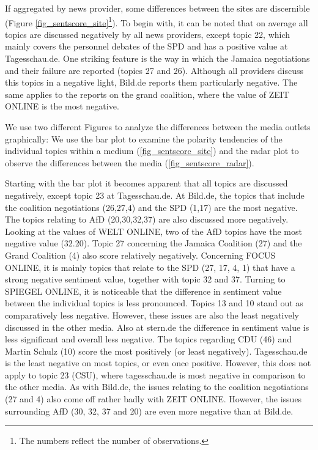 \documentclass[12pt,a4paper,notitlepage]{article}
\begin{document}
If aggregated by news provider, some differences between the sites are discernible (Figure \ref{fig_sentscore_site}\footnote{The numbers reflect the number of observations.}). To begin with, it can be noted that on average all topics are discussed negatively by all news providers, except topic 22, which mainly covers the personnel debates of the SPD and has a positive value at Tagesschau.de. One striking feature is the way in which the Jamaica negotiations and their failure are reported (topics 27 and 26). Although all providers discuss this topics in a negative light, Bild.de reports them particularly negative. The same applies to the reports on the grand coalition, where the value of ZEIT ONLINE is the most negative. 

We use two different Figures to analyze the differences between the media outlets graphically: We use the bar plot to examine the polarity tendencies of the individual topics within a medium (\ref{fig_sentscore_site}) and the radar plot to observe the differences between the media (\ref{fig_sentscore_radar}).

Starting with the bar plot it becomes apparent that all topics are discussed negatively, except topic 23 at Tagesschau.de. At Bild.de, the topics that include the coalition negotiations (26,27,4) and the SPD (1,17) are the most negative. The topics relating to AfD (20,30,32,37) are also discussed more negatively. Looking at the values of WELT ONLINE, two of the AfD topics have the most negative value (32.20). Topic 27 concerning the Jamaica Coalition (27) and the Grand Coalition (4) also score relatively negatively. Concerning FOCUS ONLINE, it is mainly topics that relate to the SPD (27, 17, 4, 1) that have a strong negative sentiment value, together with topic 32 and 37. Turning to SPIEGEL ONLINE, it is noticeable that the difference in sentiment value between the individual topics is less pronounced. Topics 13 and 10 stand out as comparatively less negative. However, these issues are also the least negatively discussed in the other media. Also at stern.de the difference in sentiment value is less significant and overall less negative. The topics regarding CDU (46) and Martin Schulz (10) score the most positively (or least negatively). Tagesschau.de is the least negative on most topics, or even once positive. However, this does not apply to topic 23 (CSU), where tagesschau.de is most negative in comparison to the other media. As with Bild.de, the issues relating to the coalition negotiations (27 and 4) also come off rather badly with ZEIT ONLINE. However, the issues surrounding AfD (30, 32, 37 and 20) are even more negative than at Bild.de. 
\end{document}
